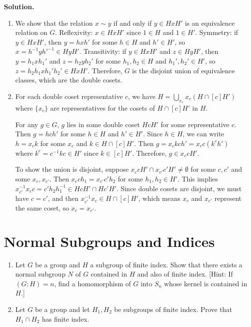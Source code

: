 \noindent\textbf{Solution.}
\begin{enumerate}[label=(\alph*)]
\item We show that the relation $x \sim y$ if and only if $y \in HxH'$ is an equivalence relation on $G$. Reflexivity: $x \in HxH'$ since $1 \in H$ and $1 \in H'$. Symmetry: if $y \in HxH'$, then $y = hxh'$ for some $h \in H$ and $h' \in H'$, so $x = h^{-1}yh'^{-1} \in HyH'$. Transitivity: if $y \in HxH'$ and $z \in HyH'$, then $y = h_1xh_1'$ and $z = h_2yh_2'$ for some $h_1, h_2 \in H$ and $h_1', h_2' \in H'$, so $z = h_2h_1xh_1'h_2' \in HxH'$. Therefore, $G$ is the disjoint union of equivalence classes, which are the double cosets.

\item For each double coset representative $c$, we have $H = \bigcup_{x_c} x_c(H \cap [c]H')$ where $\{x_c\}$ are representatives for the cosets of $H \cap [c]H'$ in $H$. 

For any $g \in G$, $g$ lies in some double coset $HcH'$ for some representative $c$. Then $g = hch'$ for some $h \in H$ and $h' \in H'$. Since $h \in H$, we can write $h = x_c k$ for some $x_c$ and $k \in H \cap [c]H'$. Then $g = x_c kch' = x_c c(k^c h')$ where $k^c = c^{-1}kc \in H'$ since $k \in [c]H'$. Therefore, $g \in x_c cH'$.

To show the union is disjoint, suppose $x_c cH' \cap x_{c'} c'H' \neq \emptyset$ for some $c, c'$ and some $x_c, x_{c'}$. Then $x_c ch_1 = x_{c'} c'h_2$ for some $h_1, h_2 \in H'$. This implies $x_{c'}^{-1}x_c c = c'h_2h_1^{-1} \in HcH' \cap Hc'H'$. Since double cosets are disjoint, we must have $c = c'$, and then $x_{c'}^{-1}x_c \in H \cap [c]H'$, which means $x_c$ and $x_{c'}$ represent the same coset, so $x_c = x_{c'}$.
\end{enumerate}

\section{Normal Subgroups and Indices}

\begin{problembox}
\begin{enumerate}[label=(\alph*)]
\item Let $G$ be a group and $H$ a subgroup of finite index. Show that there exists a normal subgroup $N$ of $G$ contained in $H$ and also of finite index. [Hint: If $(G : H) = n$, find a homomorphism of $G$ into $S_n$ whose kernel is contained in $H$.]
\item Let $G$ be a group and let $H_1, H_2$ be subgroups of finite index. Prove that $H_1 \cap H_2$ has finite index.
\end{enumerate}
\end{problembox}

